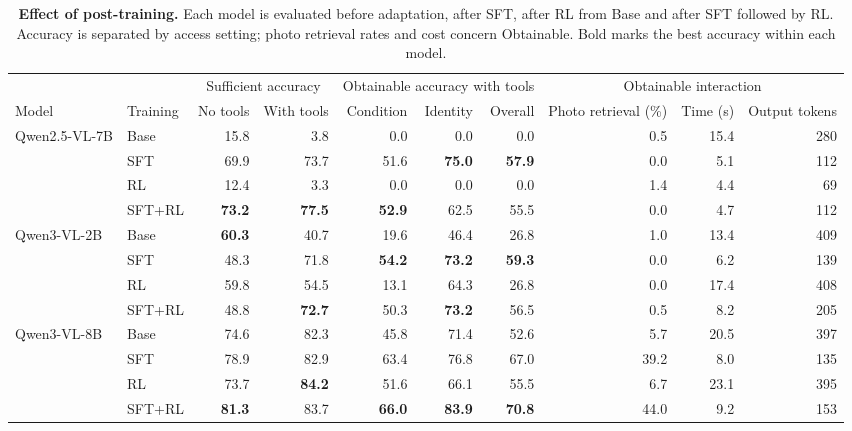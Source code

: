 \begin{table}[t]\centering\small\setlength{\tabcolsep}{3pt}
\begin{minipage}{.94\textwidth}\centering
\caption{\textbf{Effect of post-training.} Each model is evaluated before adaptation, after SFT, after RL from Base and after SFT followed by RL. Accuracy is separated by access setting; photo retrieval rates and cost concern Obtainable. Bold marks the best accuracy within each model.}
\label{tab:sft}
\begin{tabular}{@{}llrrrrrrrr@{}}\toprule
 & & \multicolumn{2}{c}{Sufficient accuracy} & \multicolumn{3}{c}{Obtainable accuracy with tools} & \multicolumn{3}{c}{Obtainable interaction}\\
\cmidrule(lr){3-4}\cmidrule(lr){5-7}\cmidrule(l){8-10}
Model & Training & No tools & With tools & Condition & Identity & Overall & Photo retrieval (\%) & Time (s) & Output tokens\\\midrule
Qwen2.5-VL-7B & Base & 15.8 & 3.8 & 0.0 & 0.0 & 0.0 & 0.5 & 15.4 & 280\\
 & SFT & 69.9 & 73.7 & 51.6 & \textbf{75.0} & \textbf{57.9} & 0.0 & 5.1 & 112\\
 & RL & 12.4 & 3.3 & 0.0 & 0.0 & 0.0 & 1.4 & 4.4 & 69\\
 & SFT+RL & \textbf{73.2} & \textbf{77.5} & \textbf{52.9} & 62.5 & 55.5 & 0.0 & 4.7 & 112\\
\midrule
Qwen3-VL-2B & Base & \textbf{60.3} & 40.7 & 19.6 & 46.4 & 26.8 & 1.0 & 13.4 & 409\\
 & SFT & 48.3 & 71.8 & \textbf{54.2} & \textbf{73.2} & \textbf{59.3} & 0.0 & 6.2 & 139\\
 & RL & 59.8 & 54.5 & 13.1 & 64.3 & 26.8 & 0.0 & 17.4 & 408\\
 & SFT+RL & 48.8 & \textbf{72.7} & 50.3 & \textbf{73.2} & 56.5 & 0.5 & 8.2 & 205\\
\midrule
Qwen3-VL-8B & Base & 74.6 & 82.3 & 45.8 & 71.4 & 52.6 & 5.7 & 20.5 & 397\\
 & SFT & 78.9 & 82.9 & 63.4 & 76.8 & 67.0 & 39.2 & 8.0 & 135\\
 & RL & 73.7 & \textbf{84.2} & 51.6 & 66.1 & 55.5 & 6.7 & 23.1 & 395\\
 & SFT+RL & \textbf{81.3} & 83.7 & \textbf{66.0} & \textbf{83.9} & \textbf{70.8} & 44.0 & 9.2 & 153\\
\bottomrule\end{tabular}\end{minipage}\end{table}
